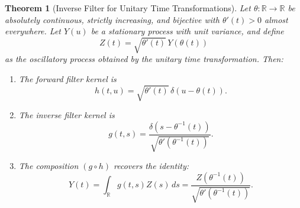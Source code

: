 \documentclass{article}
\newtheorem{theorem}{Theorem}
\begin{document}
\begin{theorem}[Inverse Filter for Unitary Time Transformations]
\label{thm:inverse-filter}
Let $\theta: \mathbb{R} \to \mathbb{R}$ be absolutely continuous, strictly increasing, and bijective with $\theta'(t) > 0$ almost everywhere. Let $Y(u)$ be a stationary process with unit variance, and define
\[
Z(t) = \sqrt{\theta'(t)} \, Y(\theta(t))
\]
as the oscillatory process obtained by the unitary time transformation. Then:
\begin{enumerate}
\item \label{item:forward}
The forward filter kernel is
\[
h(t,u) = \sqrt{\theta'(t)} \, \delta(u - \theta(t)).
\]

\item \label{item:inverse}
The inverse filter kernel is
\[
g(t,s) = \frac{\delta(s - \theta^{-1}(t))}{\sqrt{\theta'(\theta^{-1}(t))}}.
\]

\item \label{item:composition}
The composition $(g \circ h)$ recovers the identity:
\[
Y(t) = \int_{\mathbb{R}} g(t,s) Z(s) \, ds = \frac{Z(\theta^{-1}(t))}{\sqrt{\theta'(\theta^{-1}(t))}}.
\]
\end{enumerate}
\end{theorem}
\end{document}
